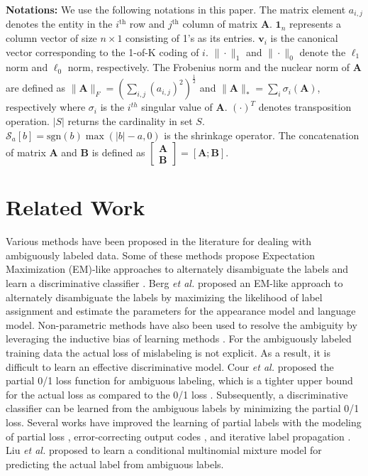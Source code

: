 \documentclass[10pt,journal,compsoc]{IEEEtran}
\begin{document}
{\bf Notations:}
We use the following notations in this paper.
The matrix element $a_{i,j}$ denotes the entity in the $i^{\mathrm{th}}$ row and $j^{\mathrm{th}}$ column of matrix $\mathbf{A}$.
$\mathbf{1}_{n}$ represents a column vector of size $n \times 1$ consisting of 1's as its entries. $\mathbf{v}_{i}$ is the canonical vector corresponding to the 1-of-K coding of $i$.
$\|\cdot\|_1$ and $\|\cdot\|_{0}$ denote the $\ell_{1}$ norm and $\ell_{0}$ norm, respectively.
The Frobenius norm and the nuclear norm of  $\mathbf{A}$  are defined as $\|\mathbf{A}\|_F=\left(\sum_{i,j}(a_{i,j})^{2}\right)^\frac{1}{2}$ and $\|\mathbf{A}\|_{*}=\sum_{i}\sigma_{i}(\mathbf{A})$, respectively where $\sigma_{i}$ is the $i^{th}$ singular value of $\mathbf{A}$.
$(\cdot)^T$ denotes transposition operation. $|S|$ returns the cardinality in set $S$. $\mathcal{S}_a[b] = \mathrm{sgn}(b) \max(|b|-a,0)$ is the shrinkage operator. The concatenation of matrix $\mathbf{A}$ and $\mathbf{B}$ is defined as $\begin{bmatrix}
\mathbf{A} \\
\mathbf{B}
\end{bmatrix} = [\mathbf{A} ; \mathbf{B}]$.



\section{Related Work} \label{Chapter_MCar:sec:Related}
Various methods have been proposed in the literature for dealing with ambiguously labeled data.  Some of these methods propose Expectation Maximization (EM)-like approaches to alternately disambiguate the labels and learn a discriminative classifier \cite{Ambroise2001,Jin2002}. Berg \emph{et al.} \cite{Berg2004} proposed an EM-like approach to alternately disambiguate the labels by maximizing the likelihood of label assignment and estimate the parameters for the appearance model and language model. Non-parametric methods have also been used to resolve the ambiguity by leveraging the inductive bias of learning methods \cite{Hullermeier2006}.  For the ambiguously labeled training data the actual loss of mislabeling is not explicit.   As a result, it is difficult to learn an effective discriminative model.  Cour \emph{et al.} \cite{Cour2009,Cour2011} proposed the partial 0/1 loss function for ambiguous labeling, which is a tighter upper bound for the actual loss as compared to the 0/1 loss \cite{Zhang2004}. Subsequently, a discriminative classifier can be learned from the ambiguous labels by minimizing the partial 0/1 loss. Several works have improved the learning of partial labels with the modeling of partial loss \cite{Cid-sueiro2012plf}, error-correcting output codes \cite{Zhang2014dfp}, and iterative label propagation \cite{Zhang2015stp}. Liu \emph{et al.} \cite{Liu2012acm} proposed to learn a conditional multinomial mixture model for predicting the actual label from ambiguous labels.  
\end{document}
